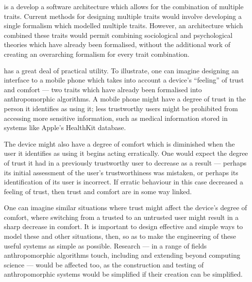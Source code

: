  is a develop a software architecture which allows for the combination of multiple traits. Current methods for designing multiple traits would involve developing a single formalism which modelled multiple traits. However, an architecture which combined these traits would permit combining sociological and psychological theories which have already been formalised, without the additional work of creating an overarching formalism for every trait combination.

 has a great deal of practical utility. To illustrate, one can imagine designing an interface to a mobile phone which takes into account a device's ``feeling'' of trust and comfort --- two traits which have already been formalised into anthropomorphic algorithms.\cite{Marsh2011, marsh1994} A mobile phone might have a degree of trust in the person it identifies as using it; less trustworthy users might be prohibited from accessing more sensitive information, such as medical information stored in systems like Apple's HealthKit database.\par
The device might also have a degree of comfort which is diminished when the user it identifies as using it begins acting erratically. One would expect the degree of trust it had in a previously trustworthy user to decrease as a result --- perhaps its initial assessment of the user's trustworthiness was mistaken, or perhaps its identification of its user is incorrect. If erratic behaviour in this case decreased a feeling of trust, then trust and comfort are in some way linked. \par

One can imagine similar situations where trust might affect the device's degree of comfort, where switching from a trusted to an untrusted user might result in a sharp decrease in comfort. It is important to design effective and simple ways to model these and other situations, then, so as to make the engineering of these useful systems as simple as possible. Research --- in a range of fields anthropomorphic algorithms touch, including and extending beyond computing science --- would be affected too, as the construction and testing of anthropomorphic systems would be simplified if their creation can be simplified.\par

